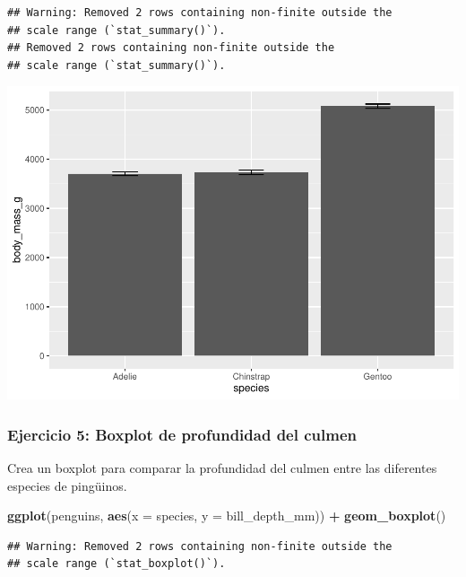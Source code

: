 \documentclass[
]{book}
\newenvironment{Shaded}{\begin{snugshade}}{\end{snugshade}}
\newcommand{\AttributeTok}[1]{\textcolor[rgb]{0.13,0.29,0.53}{#1}}
\newcommand{\FunctionTok}[1]{\textcolor[rgb]{0.13,0.29,0.53}{\textbf{#1}}}
\newcommand{\NormalTok}[1]{#1}
\newcommand{\SpecialCharTok}[1]{\textcolor[rgb]{0.81,0.36,0.00}{\textbf{#1}}}
\begin{document}
\begin{verbatim}
## Warning: Removed 2 rows containing non-finite outside the
## scale range (`stat_summary()`).
## Removed 2 rows containing non-finite outside the
## scale range (`stat_summary()`).
\end{verbatim}

\includegraphics{bookdown-demo_files/figure-latex/unnamed-chunk-186-1.pdf}

\subsubsection{Ejercicio 5: Boxplot de profundidad del culmen}\label{ejercicio-5-boxplot-de-profundidad-del-culmen}

Crea un boxplot para comparar la profundidad del culmen entre las diferentes especies de pingüinos.

\begin{Shaded}
\begin{Highlighting}[]
\FunctionTok{ggplot}\NormalTok{(penguins, }\FunctionTok{aes}\NormalTok{(}\AttributeTok{x =}\NormalTok{ species, }\AttributeTok{y =}\NormalTok{ bill\_depth\_mm)) }\SpecialCharTok{+}
  \FunctionTok{geom\_boxplot}\NormalTok{()}
\end{Highlighting}
\end{Shaded}

\begin{verbatim}
## Warning: Removed 2 rows containing non-finite outside the
## scale range (`stat_boxplot()`).
\end{verbatim}
\end{document}
